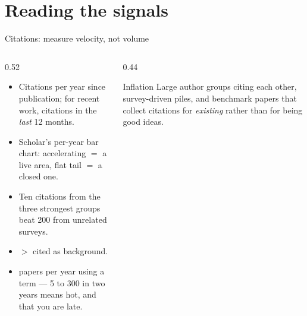 \documentclass[aspectratio=169,11pt]{beamer}
\begin{document}
\section{Reading the signals}

\begin{frame}{Citations: measure velocity, not volume}
\begin{columns}[T]
\begin{column}{0.52\textwidth}
\small
\begin{itemize}
  \item {} Citations per year since publication; for
        recent work, citations in the \emph{last} 12 months.
  \item {} Scholar's per-year bar chart:
        accelerating $=$ a live area, flat tail $=$ a closed one.
  \item {} Ten citations from the three
        strongest groups beat 200 from unrelated surveys.
  \item {} $>$ cited as background.
  \item {} papers per year using a term --- 5 to 300 in two
        years means hot, and that you are late.
\end{itemize}
\end{column}
\begin{column}{0.44\textwidth}
\begin{alertblock}{Inflation}
\footnotesize
Large author groups citing each other, survey-driven piles, and benchmark
papers that collect citations for \emph{existing} rather than for being good
ideas.
\end{alertblock}
\end{column}
\end{columns}
\end{frame}
\end{document}

